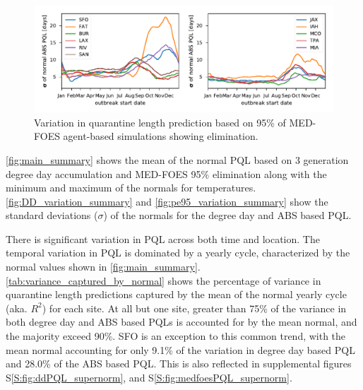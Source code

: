 \documentclass[10pt,a4paper,twocolumn]{article}
\begin{document}
\begin{figure}[ht!]
\centering
\includegraphics{figs/fig_pe95_variation.pdf}
\caption{\label{fig:pe95_variation_summary}Variation in quarantine length prediction 
based on 95\% of MED-FOES agent-based simulations showing elimination.}
\end{figure}


\autoref{fig:main_summary} shows 
the mean of the normal PQL based on 3 generation degree day accumulation 
and MED-FOES 95\% elimination
along with the minimum and maximum of the normals for temperatures.
\autoref{fig:DD_variation_summary} and \autoref{fig:pe95_variation_summary} show the 
standard deviations ($\sigma$) of the normals for the degree day and ABS based PQL.

There is significant variation in PQL across both time and location.
The temporal variation in PQL is dominated by a yearly cycle, 
characterized by the normal values shown in \autoref{fig:main_summary}.
\autoref{tab:variance_captured_by_normal} shows the percentage of variance in 
quarantine length predictions captured by the mean of the normal yearly cycle (aka. $R^2$) for each site.
At all but one site, greater than 75\% of the variance in both degree day and ABS based PQLs
is accounted for by the mean normal, and the majority exceed 90\%.
SFO is an exception to this common trend, with the mean normal accounting for only 9.1\% of the variation in 
degree day based PQL and 28.0\% of the ABS based PQL.
This is also reflected in supplemental figures
S\ref{S:fig:ddPQL_supernorm},
and S\ref{S:fig:medfoesPQL_supernorm}.
\end{document}

